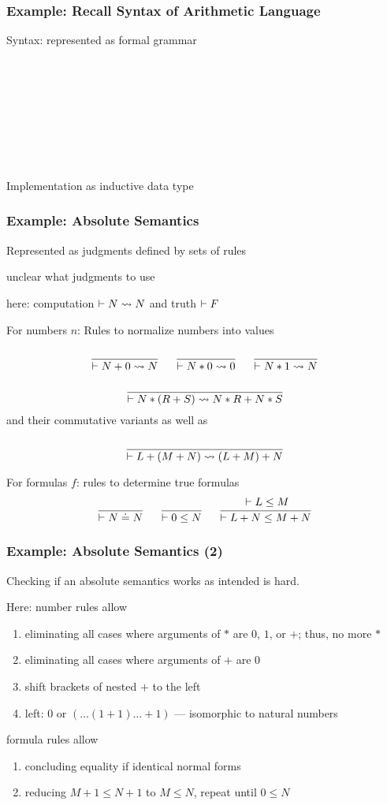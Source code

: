\begin{frame}\frametitle{Example: Recall Syntax of Arithmetic Language}
Syntax: represented as formal grammar

\begin{commgrammar}
\\
\\
\\
\\
\\
\\
\\
\end{commgrammar}

Implementation as inductive data type
\end{frame}

\begin{frame}\frametitle{Example: Absolute Semantics}
\begin{blockitems}{Represented as judgments defined by sets of rules}
\item unclear what judgments to use
\item here: computation $\vdash N \rightsquigarrow N$ and truth $\vdash F$
\end{blockitems}

For numbers $n$: Rules to normalize numbers into values
\[\cfrac{}{\vdash N+0\rightsquigarrow N}\, \hspace*{.5cm} \cfrac{}{\vdash N*0\rightsquigarrow 0}\,\hspace*{.5cm} \cfrac{}{\vdash N*1\rightsquigarrow N}\,\]
\[\cfrac{}{\vdash N*(R+S)\rightsquigarrow N*R+N*S}\,\]
and their commutative variants as well as
\[\cfrac{}{\vdash L+(M+N)\rightsquigarrow (L+M)+N}\,\]


For formulas $f$: rules to determine true formulas
\[\cfrac{}{\vdash N\doteq N}\, \hspace*{.5cm} \cfrac{}{\vdash 0\leq N}\, \hspace*{.5cm} \cfrac{\vdash L\leq M}{\vdash L+N\leq M+N}\,\]
\end{frame}

\begin{frame}\frametitle{Example: Absolute Semantics (2)}
Checking if an absolute semantics works as intended is hard.

Here: number rules allow
\begin{enumerate}
\item eliminating all cases where arguments of $*$ are $0$, $1$, or $+$; thus, no more $*$
\item eliminating all cases where arguments of $+$ are $0$
\item shift brackets of nested $+$ to the left
\item left: $0$ or $(\ldots(1+1)\ldots+1)$ --- isomorphic to natural numbers
\end{enumerate}
formula rules allow
\begin{enumerate}
\item concluding equality if identical normal forms
\item reducing $M+1\leq N+1$ to $M\leq N$, repeat until $0\leq N$
\end{enumerate}
\end{frame}


